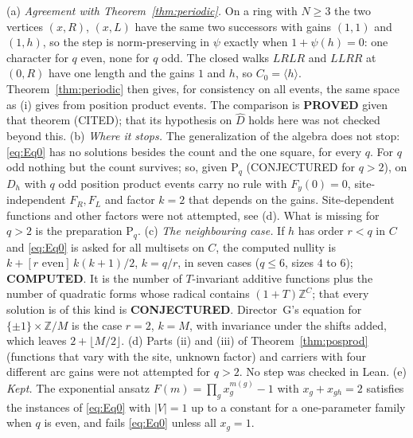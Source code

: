 \begin{remark}
(a) \emph{Agreement with Theorem~\ref{thm:periodic}.} On a ring with $N\ge3$ the two vertices $(x,R)$, $(x,L)$ have the same two successors with gains $(1,1)$ and $(1,h)$, so the step is norm-preserving in $\psi$ exactly when $1+\psi(h)=0$: one character for $q$ even, none for $q$ odd. The closed walks $LRLR$ and $LLRR$ at $(0,R)$ have one length and the gains $1$ and $h$, so $C_0=\langle h\rangle$. Theorem~\ref{thm:periodic} then gives, for consistency on all events, the same space as (i) gives from position product events. The comparison is \textbf{PROVED} given that theorem (CITED); that its hypothesis on $\hat D$ holds here was not checked beyond this.
(b) \emph{Where it stops.} The generalization of the algebra does not stop: \eqref{eq:Eq0} has no solutions besides the count and the one square, for every $q$. For $q$ odd nothing but the count survives; so, given $\mathrm{P}_q$ (CONJECTURED for $q>2$), on $D_h$ with $q$ odd position product events carry no rule with $F_y(0)=0$, site-independent $F_R,F_L$ and factor $k=2$ that depends on the gains. Site-dependent functions and other factors were not attempted, see (d). What is missing for $q>2$ is the preparation $\mathrm{P}_q$.
(c) \emph{The neighbouring case.} If $h$ has order $r<q$ in $C$ and \eqref{eq:Eq0} is asked for all multisets on $C$, the computed nullity is $k+[r\text{ even}]\,k(k+1)/2$, $k=q/r$, in seven cases ($q\le6$, sizes $4$ to $6$); \textbf{COMPUTED}. It is the number of $T$-invariant additive functions plus the number of quadratic forms whose radical contains $(1+T)\mathbb{Z}^C$; that every solution is of this kind is \textbf{CONJECTURED}. Director~G's equation for $\{\pm1\}\times\mathbb{Z}/M$ is the case $r=2$, $k=M$, with invariance under the shifts added, which leaves $2+\lfloor M/2\rfloor$.
(d) Parts (ii) and (iii) of Theorem~\ref{thm:posprod} (functions that vary with the site, unknown factor) and carriers with four different arc gains were not attempted for $q>2$. No step was checked in Lean.
(e) \emph{Kept.} The exponential ansatz $F(m)=\prod_gx_g^{m(g)}-1$ with $x_g+x_{gh}=2$ satisfies the instances of \eqref{eq:Eq0} with $|V|=1$ up to a constant for a one-parameter family when $q$ is even, and fails \eqref{eq:Eq0} unless all $x_g=1$.
\end{remark}

